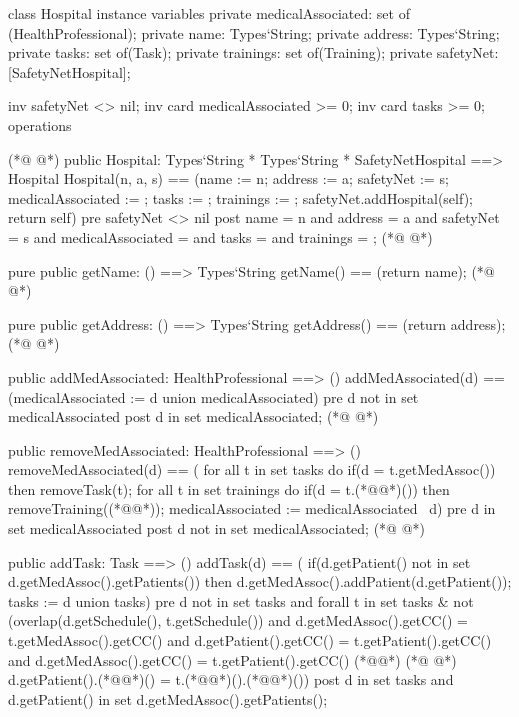 \begin{vdmpp}[breaklines=true]
class Hospital
instance variables
  private medicalAssociated: set of (HealthProfessional);
  private name: Types`String;
  private address: Types`String;
  private tasks: set of(Task);
  private trainings: set of(Training);
  private safetyNet: [SafetyNetHospital];
 
 inv safetyNet <> nil; 
 inv card medicalAssociated >= 0;
 inv card tasks >= 0;
operations

(*@
\label{Hospital:15}
@*)
 public Hospital: Types`String * Types`String * SafetyNetHospital ==> Hospital
  Hospital(n, a, s) == (name := n; address := a; safetyNet := s; medicalAssociated := {}; tasks := {}; trainings := {}; 
  safetyNet.addHospital(self); return self)
 pre safetyNet <> nil
 post name = n and address = a and safetyNet = s and medicalAssociated = {} and tasks = {} and trainings = {};
(*@
\label{getName:20}
@*)
 
 pure public getName: () ==> Types`String
  getName() == (return name);
(*@
\label{getAddress:23}
@*)
 
 pure public getAddress: () ==> Types`String
  getAddress() == (return address);
(*@
\label{addMedAssociated:26}
@*)
 
 public addMedAssociated: HealthProfessional ==> ()
  addMedAssociated(d) == (medicalAssociated := {d} union medicalAssociated)
 pre d not in set medicalAssociated
 post d in set medicalAssociated;
(*@
\label{removeMedAssociated:31}
@*)
  
 public removeMedAssociated: HealthProfessional ==> ()
  removeMedAssociated(d) == (
                for all t in set tasks do
                 if(d = t.getMedAssoc())
                  then removeTask(t);
                for all t in set trainings do
                 if(d = t.(*@@*)())
                  then removeTraining((*@@*));
                medicalAssociated := medicalAssociated \ {d})
 pre d in set medicalAssociated
 post d not in set medicalAssociated;
(*@
\label{addTask:43}
@*)
 
 public addTask: Task ==> ()
  addTask(d) == (
          if(d.getPatient() not in set d.getMedAssoc().getPatients())
           then d.getMedAssoc().addPatient(d.getPatient());
          tasks := {d} union tasks)
 pre d not in set tasks and forall t in set tasks & 
  not (overlap(d.getSchedule(), t.getSchedule()) and d.getMedAssoc().getCC() = t.getMedAssoc().getCC()
  and d.getPatient().getCC() = t.getPatient().getCC() and d.getMedAssoc().getCC() = t.getPatient().getCC() (*@@*) 
(*@
\label{removeTask:52}
@*)
  d.getPatient().(*@@*)() = t.(*@@*)().(*@@*)())
 post d in set tasks and d.getPatient() in set d.getMedAssoc().getPatients();
  

\end{vdmpp}

